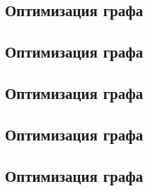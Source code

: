 

\subsection{Оптимизация графа}



\subsection{Оптимизация графа}




\subsection{Оптимизация графа}




\subsection{Оптимизация графа}



\subsection{Оптимизация графа}

